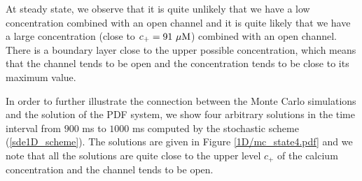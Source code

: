 At steady state, we observe that it is quite unlikely that we have a low concentration combined with an open channel and it is quite likely that we have a large concentration (close to $c_+=91\text{ }\rm{\mu M}$) combined with an open channel. There is a boundary layer close to the upper possible concentration, which means that the channel tends to be open and the concentration tends to be close to its maximum value. 

In order to further illustrate the connection between the Monte Carlo simulations and the solution of the PDF system, we show four arbitrary solutions in the time interval from $900$ ms to $1000$ ms computed by the stochastic scheme (\ref{sde1D_scheme}). The solutions are given in Figure \ref{1D/mc_state4.pdf} and we note that all the solutions are quite close to the upper level $c_+$ of the calcium concentration and the channel tends to be open. 



